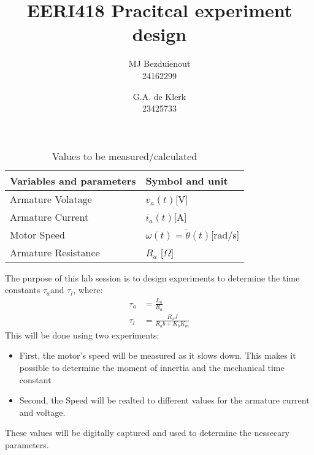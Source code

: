 \documentclass[10pt]{article}
\title{EERI418 Pracitcal experiment design}
\author{MJ Bezduienout\\24162299 \and G.A. de Klerk \\23425733}
\begin{document}
\maketitle


\begin{table}[h]
\centering
\caption{Values to be measured/calculated}
\label{my-label}
\begin{tabular}{@{}ll@{}}
\toprule
Variables and parameters & Symbol and unit                          \\ \midrule
Armature Volatage        & $v_a(t)${[}V{]}                          \\
Armature Current         & $i_a(t)${[}A{]}                          \\
Motor Speed              & $\omega(t) = \dot{\theta}(t)${[}rad/s{]} \\
Armature Resistance      & $R_a$ {[}$\Omega${]}                     \\ \bottomrule
\end{tabular}
\end{table}

The purpose of this lab session is to design experiments to determine the time constants $\tau_a$and $\tau_l$, where:\\
\begin{align*}
\tau_a & = \frac{L_a}{R_a} \\
\tau_l & = \frac{R_aJ}{R_ab+K_bK_m} 
\end{align*}
This will be done using two experiments:
\begin{itemize}
	\item First, the motor's speed will be measured as it slows down. This makes it possible to determine the moment of innertia and the mechanical time constant
	\item Second, the Speed will be realted to different values for the armature current and voltage.
\end{itemize}
These values will be digitally captured and used to determine the nessecary parameters. 
\end{document}
